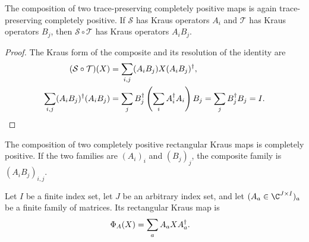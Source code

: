 
\begin{lemma}
    \label{lem:is_kraus_cptp_comp}
    \leanok
    The composition of two trace-preserving completely positive maps is again
    trace-preserving completely positive. If $\mathcal{S}$ has Kraus operators
    $A_i$ and $\mathcal{T}$ has Kraus operators $B_j$, then
    $\mathcal{S}\circ\mathcal{T}$ has Kraus operators $A_iB_j$.
\end{lemma}
\begin{proof}
    \leanok
    The Kraus form of the composite and its resolution of the identity are
    \begin{align}
        (\mathcal{S}\circ\mathcal{T})(X)
        &=\sum_{i,j}(A_iB_j)X(A_iB_j)^\dagger,
        \notag\\
        \sum_{i,j}(A_iB_j)^\dagger(A_iB_j)
        &=\sum_j B_j^\dagger\left(\sum_i A_i^\dagger A_i\right)B_j
          =\sum_j B_j^\dagger B_j=I.
        \notag
    \end{align}
\end{proof}

\begin{lemma}
    \label{lem:is_kraus_cp_comp}
    \leanok
    The composition of two completely positive rectangular Kraus maps is
    completely positive. If the two families are $(A_i)_i$ and $(B_j)_j$,
    the composite family is $(A_iB_j)_{i,j}$.
\end{lemma}

\begin{definition}
    \label{def:mpdo_rectangular_kraus_map}
    \leanok
    Let $I$ be a finite index set, let $J$ be an arbitrary index set, and let
    $(A_a\in\C^{J\times I})_a$ be a finite family of matrices. Its
    rectangular Kraus map is
    \begin{align}
        \Phi_A(X)&=\sum_a A_aXA_a^\dagger.
        \notag
    \end{align}
\end{definition}

